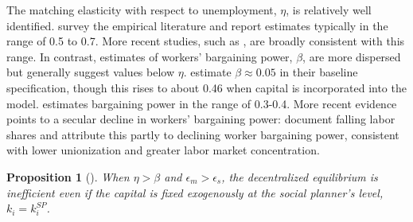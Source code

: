 \documentclass[12pt]{article} %
\newtheorem{proposition}{Proposition}
\theoremstyle{definition}
\begin{document}
The matching elasticity with respect to unemployment, $\eta$, is relatively well identified. \cite{petrongolo2001looking} survey the empirical literature and report estimates typically in the range of  0.5 to 0.7. More recent studies, such as \citep{borowczyk2013match}, are broadly consistent with this range. In contrast, estimates of workers' bargaining power, $\beta$, are more dispersed but generally suggest values below $\eta$. \cite{hagedorn2008cyclical} estimate $\beta \approx 0.05$ in their baseline specification, though this rises to about 0.46 when capital is incorporated into the model. \cite{flinn2006minimum} estimates bargaining power in the range of 0.3-0.4. More recent evidence points to a secular decline in workers' bargaining power: \cite{azar2022labor} document falling labor shares and attribute this partly to declining worker bargaining power, consistent with lower unionization and greater labor market concentration.







\begin{proposition}[]
\label{prop:double_penalty}
When $\eta > \beta$ and $\epsilon_m>\epsilon_s$, the decentralized equilibrium is inefficient even if the capital is fixed exogenously  at the social planner's level, $k_i = k_i^{SP}$.
\end{proposition}
\end{document}
